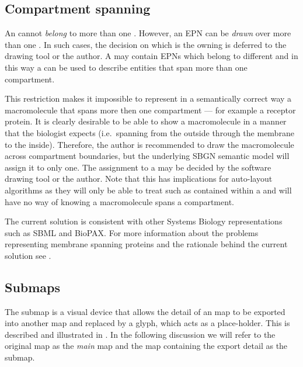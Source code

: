 \subsection{Compartment spanning}

An  cannot \emph{belong} to more than one
. However, an EPN can be \emph{drawn} over more than one
. In such cases, the decision on which is the owning
 is deferred to the drawing tool or the
author. A  may contain EPNs which belong to different
 and in this way a  can be used to describe
entities that span more than one {compartment}.

This restriction makes it impossible to represent in a semantically
correct way a macromolecule that spans more then one compartment ---
for example a receptor protein. It is clearly desirable to be able to
show a macromolecule in a manner that the biologist expects (i.e.\,
spanning from the outside through the membrane to the
inside). Therefore, the author is recommended to draw the
macromolecule across compartment boundaries, but the underlying SBGN
semantic model will assign it to only one. The assignment to a
 may be decided by the software drawing tool or the
author. Note that this has implications for auto-layout algorithms as
they will only be able to treat such  as contained within
a  and will have no way of knowing a macromolecule spans a
compartment.

The current solution is consistent with other Systems Biology
representations such as SBML and BioPAX. For more information about the
problems representing membrane spanning proteins and the rationale
behind the current solution see .

\subsection{Submaps}

The submap is a visual device that allows the detail of an \PD map to be exported into another \PD map and replaced by a  glyph, which acts as a place-holder. This is described and illustrated in . In the following discussion we will refer to the original map as the \emph{main} map and the map containing the export detail as the submap. 

